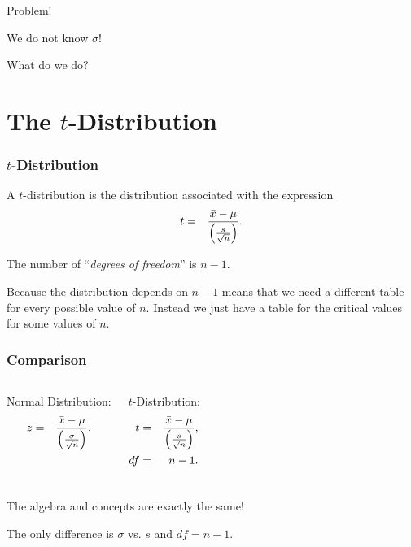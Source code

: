 \begin{frame}{Problem!}

  We do not know $\sigma$!

  What do we do?
  
\end{frame}





\section{The $t$-Distribution}


\begin{frame}
  \frametitle{$t$-Distribution}

  \begin{definition}[$t$-Distribution]

    A $t$-distribution is the distribution associated with the expression
    \begin{eqnarray*}
      t &  = & \frac{\bar{x}-\mu}{\left( \frac{s}{\sqrt{n}} \right)}.
    \end{eqnarray*}

    The number of ``\textit{degrees of freedom}'' is $n-1$.
    
  \end{definition}

  Because the distribution depends on $n-1$ means that we need a
  different table for every possible value of $n$. Instead we just
  have a table for the critical values for some values of $n$.
  

\end{frame}



\begin{frame}
  \frametitle{Comparison}

  \begin{columns}
    Normal Distribution:
    \begin{eqnarray*}
      z &  = & \frac{\bar{x}-\mu}{\left( \frac{\sigma}{\sqrt{n}} \right)}.
    \end{eqnarray*}

    $t$-Distribution:
    \begin{eqnarray*}
      t &  = & \frac{\bar{x}-\mu}{\left( \frac{s}{\sqrt{n}} \right)}, \\
      df & = & n-1.
    \end{eqnarray*}

  \end{columns}

  \vfill

    {

      \begin{center}
        The algebra and concepts are exactly the same!

        The only difference is $\sigma$ vs. $s$ and $df=n-1$.
      \end{center}
    }

    \vfill
  

\end{frame}



